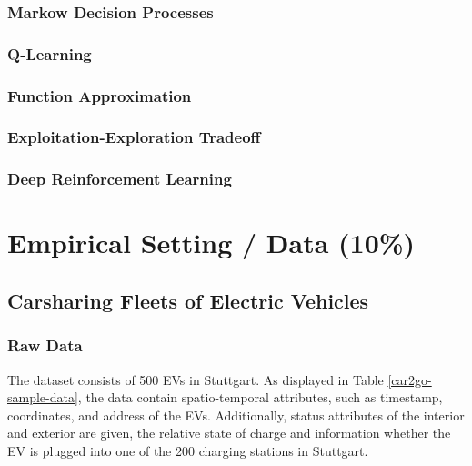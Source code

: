 \documentclass[12pt, article]{article}
\begin{document}
\subsubsection{Markow Decision Processes}
\label{sec:org9ea46af}
\subsubsection{Q-Learning}
\label{sec:org00f55c5}
\subsubsection{Function Approximation}
\label{sec:org5cdd940}
\subsubsection{Exploitation-Exploration Tradeoff}
\label{sec:org7f235e5}
\subsubsection{Deep Reinforcement Learning}
\label{sec:orgd0d9fc0}
\section{Empirical Setting / Data (10\%)}
\label{sec:org923edf3}
\subsection{Carsharing Fleets of Electric Vehicles}
\label{sec:org6697fe8}
\subsubsection{Raw Data}
\label{sec:orgab46ca6}
The dataset consists of 500 EVs in Stuttgart. As displayed in Table
\ref{car2go-sample-data}, the data contain spatio-temporal attributes, such as
timestamp, coordinates, and address of the EVs. Additionally, status attributes
of the interior and exterior are given, the relative state of charge and
information whether the EV is plugged into one of the 200 charging stations in
Stuttgart.
\end{document}
